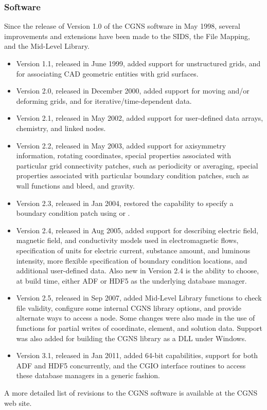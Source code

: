 \subsubsection{Software}

Since the release of Version 1.0 of the CGNS software in May 1998,
several improvements and extensions have been made to the SIDS, the File
Mapping, and the Mid-Level Library.

\begin{itemize}
\item Version 1.1, released in June 1999, added support for
      unstructured grids, and for associating CAD geometric entities
      with grid surfaces.
\item Version 2.0, released in December 2000, added support for
      moving and/or deforming grids, and for iterative/time-dependent
      data.
\item Version 2.1, released in May 2002, added support for
      user-defined data arrays, chemistry, and linked nodes.
\item Version 2.2, released in May 2003, added support for axisymmetry
      information, rotating coordinates, special properties associated
      with particular grid connectivity patches, such as periodicity or
      averaging, special properties associated with particular boundary
      condition patches, such as wall functions and bleed, and gravity.
\item Version 2.3, released in Jan 2004, restored the capability to
      specify a boundary condition patch using  or
      .
\item Version 2.4, released in Aug 2005, added support for describing
      electric field, magnetic field, and conductivity models used
      in electromagnetic flows, specification of units for electric
      current, substance amount, and luminous intensity, more flexible
      specification of boundary condition locations, and additional
      user-defined data.
      Also new in Version 2.4 is the ability to choose, at build time,
      either ADF or HDF5 as the underlying database manager.
\item Version 2.5, released in Sep 2007, added Mid-Level Library
      functions to check file validity, configure some internal CGNS
      library options, and provide alternate ways to access a node.
      Some changes were also made in the use of functions for partial
      writes of coordinate, element, and solution data.
      Support was also added for building the CGNS library as a DLL under
      Windows.
\item Version 3.1, released in Jan 2011, added 64-bit capabilities, support
      for both ADF and HDF5 concurrently, and the CGIO interface routines
      to access these database managers in a generic fashion.
\end{itemize}
A more detailed list of revisions to the CGNS software is available at
the CGNS web site.

